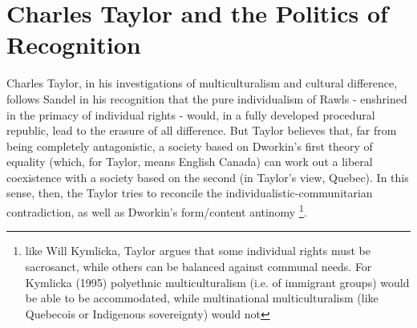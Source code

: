 \documentclass[12pt,oneside]{memoir}
\begin{document}
\section*{Charles Taylor and the Politics of Recognition}

Charles Taylor, in his investigations of multiculturalism and cultural difference, follows Sandel in his recognition that the pure individualism of Rawls - enshrined in the primacy of individual rights - would, in a fully developed procedural republic, lead to the erasure of all difference. But Taylor believes that, far from being completely antagonistic, a society based on Dworkin's first theory of equality (which, for Taylor, means English Canada) can work out a liberal coexistence with a society based on the second (in Taylor's view, Quebec). In this sense, then, the Taylor tries to reconcile the individualistic-communitarian contradiction, as well as Dworkin's form/content antinomy \footnote{like Will Kymlicka, Taylor argues that some individual rights must be sacrosanct, while others can be balanced against communal needs. For Kymlicka (1995) polyethnic multiculturalism (i.e. of immigrant groups) would be able to be accommodated, while multinational multiculturalism (like Quebecois or Indigenous sovereignty) would not}.
	
\end{document}
